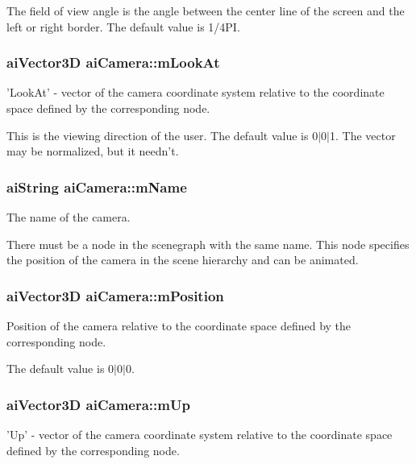 The field of view angle is the angle between the center line of the screen and the left or right border. The default value is 1/4\-P\-I. \hypertarget{structai_camera_af9463249ac870e030fa435b1186cef23}{
\subsubsection[{m\-Look\-At}]{ {\bf ai\-Vector3\-D} ai\-Camera\-::m\-Look\-At}}\label{structai_camera_af9463249ac870e030fa435b1186cef23}
'Look\-At' -\/ vector of the camera coordinate system relative to the coordinate space defined by the corresponding node.

This is the viewing direction of the user. The default value is 0$|$0$|$1. The vector may be normalized, but it needn't. \hypertarget{structai_camera_aa6a5fe5e04b3db1b23f69eb9910c6816}{
\subsubsection[{m\-Name}]{ {\bf ai\-String} ai\-Camera\-::m\-Name}}\label{structai_camera_aa6a5fe5e04b3db1b23f69eb9910c6816}
The name of the camera.

There must be a node in the scenegraph with the same name. This node specifies the position of the camera in the scene hierarchy and can be animated. \hypertarget{structai_camera_a518617ea192ca0698e748a4399e7c3a5}{
\subsubsection[{m\-Position}]{ {\bf ai\-Vector3\-D} ai\-Camera\-::m\-Position}}\label{structai_camera_a518617ea192ca0698e748a4399e7c3a5}
Position of the camera relative to the coordinate space defined by the corresponding node.

The default value is 0$|$0$|$0. \hypertarget{structai_camera_a7fb42b287389b4f99c883098268d6d1a}{
\subsubsection[{m\-Up}]{ {\bf ai\-Vector3\-D} ai\-Camera\-::m\-Up}}\label{structai_camera_a7fb42b287389b4f99c883098268d6d1a}
'Up' -\/ vector of the camera coordinate system relative to the coordinate space defined by the corresponding node.

